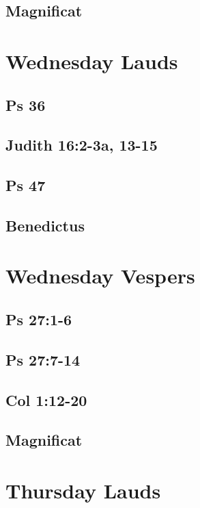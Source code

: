 \subsection{Magnificat}


\section{Wednesday Lauds}

\subsection{Ps 36}

\subsection{Judith 16:2-3a, 13-15}

\subsection{Ps 47}

\subsection{Benedictus}


\section{Wednesday Vespers}

\subsection{Ps 27:1-6}

\subsection{Ps 27:7-14}

\subsection{Col 1:12-20}

\subsection{Magnificat}


\section{Thursday Lauds}

